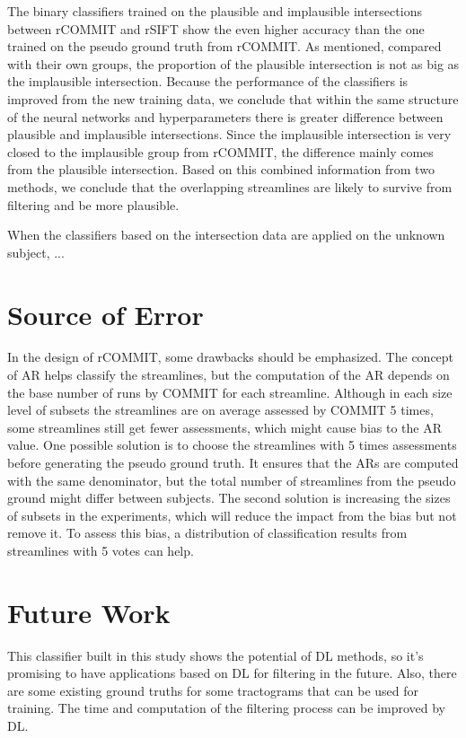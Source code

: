 The binary classifiers trained on the plausible and implausible intersections between rCOMMIT and rSIFT show the even higher accuracy than
the one trained on the pseudo ground truth from rCOMMIT. As mentioned, compared with their own groups, the proportion of the plausible intersection is not as big as the 
implausible intersection. Because the performance of the classifiers is improved from the new training data, we conclude that within the same
structure of the neural networks and hyperparameters there is greater difference between plausible and implausible intersections.
Since the implausible intersection is very closed to the implausible group from rCOMMIT, the difference mainly comes from the plausible intersection.
Based on this combined information from two methods, we conclude that the overlapping streamlines are likely to survive from filtering and be more plausible.

When the classifiers based on the intersection data are applied on the unknown subject, ...  


\section{Source of Error}

In the design of rCOMMIT, some drawbacks should be emphasized. The concept of AR helps classify the streamlines, but the 
computation of the AR depends on the base number of runs by COMMIT for each streamline. 
Although in each size level of subsets the streamlines are on average assessed by COMMIT 5 times, some streamlines still get fewer assessments,
which might cause bias to the AR value. One possible solution is to choose the streamlines with 5 times assessments before
generating the pseudo ground truth. It ensures that the ARs are computed with the same denominator, 
but the total number of streamlines from the pseudo ground might differ between subjects.
The second solution is increasing the sizes of subsets in the experiments, which will reduce the impact from the bias but not remove it.
To assess this bias, a distribution of classification results from streamlines with 5 votes can help.




\section{Future Work}

This classifier built in this study shows the potential of DL methods, so it's promising to have applications 
based on DL for filtering in the future. Also, there are some existing ground truths for some tractograms that 
can be used for training. The time and computation of the filtering process can be improved by DL.   

